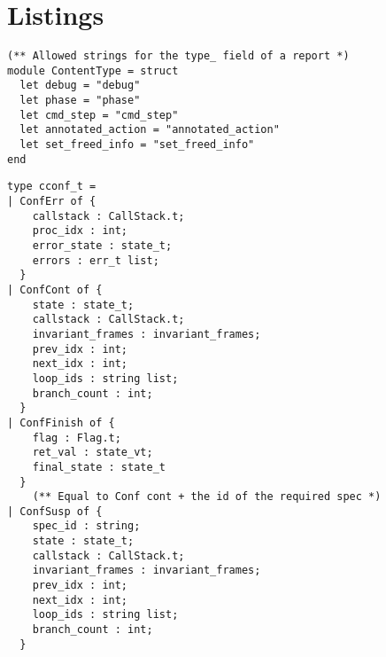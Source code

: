 
\appendix
\chapter{Listings}

\begin{lstlisting}[caption={
  \texttt{loggingConstants.ml}, pre-project
  \label{lst:loggingconstants}}, style=code]
(** Allowed strings for the type_ field of a report *)
module ContentType = struct
  let debug = "debug"
  let phase = "phase"
  let cmd_step = "cmd_step"
  let annotated_action = "annotated_action"
  let set_freed_info = "set_freed_info"
end
\end{lstlisting}

\begin{lstlisting}[caption={
  The \texttt{cconf\_t} type in \texttt{GInterpreter.ml}, pre-project
  \label{lst:cconf-type}}, style=code]
type cconf_t =
| ConfErr of {
    callstack : CallStack.t;
    proc_idx : int;
    error_state : state_t;
    errors : err_t list;
  }
| ConfCont of {
    state : state_t;
    callstack : CallStack.t;
    invariant_frames : invariant_frames;
    prev_idx : int;
    next_idx : int;
    loop_ids : string list;
    branch_count : int;
  }
| ConfFinish of {
    flag : Flag.t;
    ret_val : state_vt;
    final_state : state_t
  }
    (** Equal to Conf cont + the id of the required spec *)
| ConfSusp of {
    spec_id : string;
    state : state_t;
    callstack : CallStack.t;
    invariant_frames : invariant_frames;
    prev_idx : int;
    next_idx : int;
    loop_ids : string list;
    branch_count : int;
  }
\end{lstlisting}

